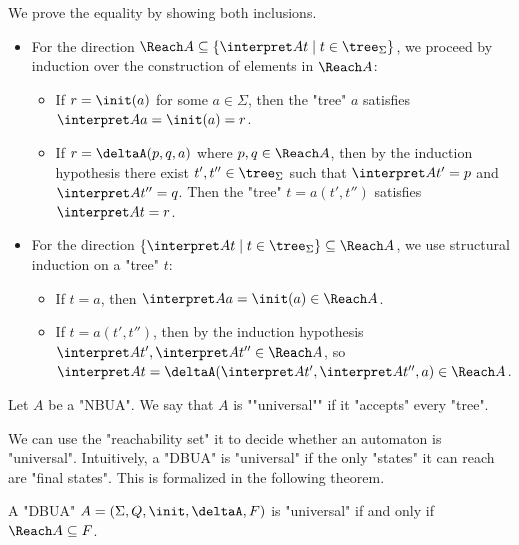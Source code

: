 \documentclass[a4paper,UKenglish,cleveref, autoref, thm-restate]{lipics-v2021}
\begin{document}
\begin{proofI}
	We prove the equality by showing both inclusions.
	\begin{itemize}
		\item For the direction $\Reach A \subseteq \setdef {\interpret A t} {t \in \tree_\Sigma}$, we proceed by induction over the construction of elements in $\Reach A$:
		      \begin{itemize}
			      \item If $r = \init(a)$ for some $a \in \Sigma$, then the "tree" $a$ satisfies $\interpret A a = \init(a) = r$.
			      \item If $r = \deltaA(p, q, a)$ where $p, q \in \Reach A$, then by the induction hypothesis there exist
			            $t', t'' \in \tree_\Sigma$ such that $\interpret A {t'} = p$ and $\interpret A {t''} = q$. Then the "tree" $t = a(t', t'')$ satisfies $\interpret A t = r$.
		      \end{itemize}

		\item For the direction $\setdef {\interpret A t} {t \in \tree_\Sigma} \subseteq \Reach A$, we use structural induction on a "tree" $t$:
		      \begin{itemize}
			      \item If $t = a$, then $\interpret A a = \init(a) \in \Reach A$.
			      \item If $t = a(t', t'')$, then by the induction hypothesis $\interpret A {t'}, \interpret A {t''} \in \Reach A$, so
			            $\interpret A t = \deltaA(\interpret A {t'}, \interpret A {t''}, a) \in \Reach A$.
		      \end{itemize}
	\end{itemize}
\end{proofI}

\begin{definition}
	\AP Let $A$ be a "NBUA". We say that $A$ is ""universal"" if it "accepts" every "tree".
\end{definition}

We can use the "reachability set" it to decide whether an automaton is "universal". Intuitively, a "DBUA" is "universal" if
the only "states" it can reach are "final states". This is formalized in the following theorem.

\begin{theorem}\label{thm:universal-Reach}
	A "DBUA" $A = \DBUA$ is "universal" if and only if $\Reach A \subseteq F$.
\end{theorem}
\end{document}
